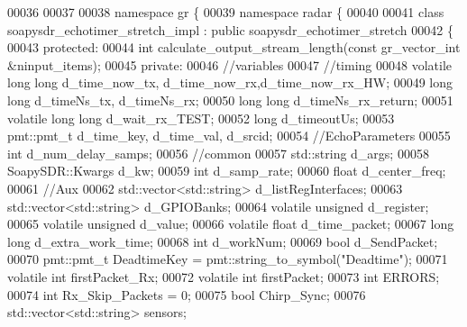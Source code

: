 \begin{DoxyCode}
00036 
00037 
00038 \textcolor{keyword}{namespace }gr \{
00039   \textcolor{keyword}{namespace }radar \{
00040 
00041     \textcolor{keyword}{class }soapysdr_echotimer_stretch_impl : \textcolor{keyword}{public} soapysdr_echotimer_stretch
00042     \{
00043       \textcolor{keyword}{protected}:
00044         \textcolor{keywordtype}{int} calculate_output_stream_length(\textcolor{keyword}{const} gr\_vector\_int &ninput\_items);
00045       \textcolor{keyword}{private}:
00046        \textcolor{comment}{//variables}
00047          \textcolor{comment}{//timing}
00048          \textcolor{keyword}{volatile} \textcolor{keywordtype}{long} \textcolor{keywordtype}{long} d_time_now_tx, d_time_now_rx,d_time_now_rx_HW;
00049          \textcolor{keywordtype}{long} \textcolor{keywordtype}{long} d_timeNs_tx, d_timeNs_rx;
00050          \textcolor{keywordtype}{long} \textcolor{keywordtype}{long} d_timeNs_rx_return;
00051          \textcolor{keyword}{volatile} \textcolor{keywordtype}{long} \textcolor{keywordtype}{long} d_wait_rx_TEST;
00052          \textcolor{keywordtype}{long} d_timeoutUs;
00053          pmt::pmt\_t d_time_key, d_time_val, d_srcid;
00054          \textcolor{comment}{//EchoParameters}
00055          \textcolor{keywordtype}{int} d_num_delay_samps;
00056          \textcolor{comment}{//common}
00057          std::string d_args;
00058          SoapySDR::Kwargs d_kw;
00059          \textcolor{keywordtype}{int} d_samp_rate;
00060          \textcolor{keywordtype}{float} d_center_freq;
00061          \textcolor{comment}{//Aux}
00062          std::vector<std::string> d_listRegInterfaces;
00063          std::vector<std::string> d_GPIOBanks;
00064          \textcolor{keyword}{volatile} \textcolor{keywordtype}{unsigned} d_register;
00065          \textcolor{keyword}{volatile} \textcolor{keywordtype}{unsigned} d_value;
00066          \textcolor{keyword}{volatile} \textcolor{keywordtype}{float} d_time_packet;
00067          \textcolor{keywordtype}{long} \textcolor{keywordtype}{long} d_extra_work_time;
00068          \textcolor{keywordtype}{int} d_workNum;
00069          \textcolor{keywordtype}{bool} d_SendPacket;
00070          pmt::pmt\_t DeadtimeKey = pmt::string\_to\_symbol(\textcolor{stringliteral}{"Deadtime"});
00071          \textcolor{keyword}{volatile} \textcolor{keywordtype}{int} firstPacket_Rx;
00072          \textcolor{keyword}{volatile} \textcolor{keywordtype}{int} firstPacket;
00073          \textcolor{keywordtype}{int} ERRORS;
00074          \textcolor{keywordtype}{int} Rx_Skip_Packets = 0;
00075          \textcolor{keywordtype}{bool} Chirp_Sync;
00076          std::vector<std::string> sensors;

\end{DoxyCode}
